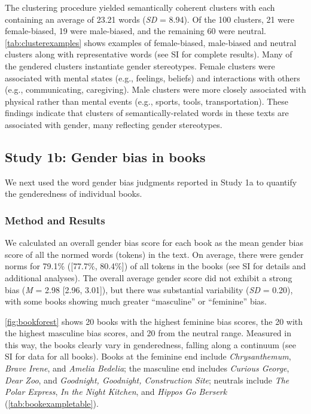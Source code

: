 \documentclass[
  english,
  ,man,floatsintext]{apa6}
\begin{document}
The clustering procedure yielded semantically coherent clusters with each containing an average of 23.21 words (\emph{SD} = 8.94). Of the 100 clusters, 21 were female-biased, 19 were male-biased, and the remaining 60 were neutral. \autoref{tab:clusterexamples} shows examples of female-biased, male-biased and neutral clusters along with representative words (see SI for complete results). Many of the gendered clusters instantiate gender stereotypes. Female clusters were associated with mental states (e.g., feelings, beliefs) and interactions with others (e.g., communicating, caregiving). Male clusters were more closely associated with physical rather than mental events (e.g., sports, tools, transportation). These findings indicate that clusters of semantically-related words in these texts are associated with gender, many reflecting gender stereotypes.

\hypertarget{study-1b-gender-bias-in-books}{%
\subsection{Study 1b: Gender bias in books}\label{study-1b-gender-bias-in-books}}

We next used the word gender bias judgments reported in Study 1a to quantify the genderedness of individual books.

\hypertarget{method-and-results}{%
\subsubsection{Method and Results}\label{method-and-results}}

We calculated an overall gender bias score for each book as the mean gender bias score of all the normed words (tokens) in the text. On average, there were gender norms for 79.1\% ({[}77.7\%, 80.4\%{]}) of all tokens in the books (see SI for details and additional analyses). The overall average gender score did not exhibit a strong bias (\emph{M} = 2.98 {[}2.96, 3.01{]}), but there was substantial variability (\emph{SD} = 0.20), with some books showing much greater ``masculine'' or ``feminine'' bias.

\autoref{fig:bookforest} shows 20 books with the highest feminine bias scores, the 20 with the highest masculine bias scores, and 20 from the neutral range. Measured in this way, the books clearly vary in genderedness, falling along a continuum (see SI for data for all books). Books at the feminine end include \emph{Chrysanthemum}, \emph{Brave Irene}, and \emph{Amelia Bedelia}; the masculine end includes \emph{Curious George}, \emph{Dear Zoo}, and \emph{Goodnight, Goodnight, Construction Site}; neutrals include \emph{The Polar Express}, \emph{In the Night Kitchen}, and \emph{Hippos Go Berserk} (\autoref{tab:bookexampletable}).
\end{document}
